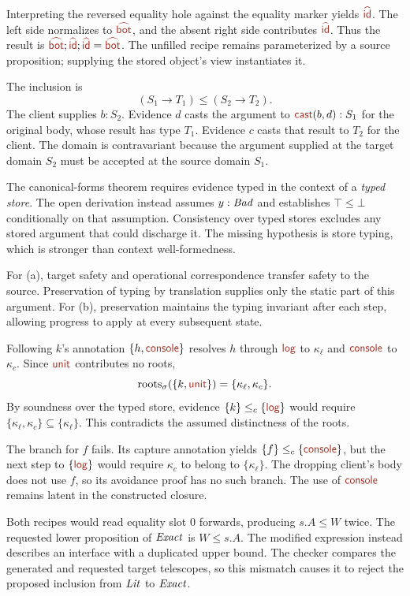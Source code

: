 Interpreting the reversed equality hole against the equality marker
yields $\form{id}$. The left side normalizes to $\form{bot}$, and the
absent right side contributes $\form{id}$. Thus the result is
$\form{bot};\form{id};\form{id}=\form{bot}$.
The unfilled recipe remains parameterized by a source proposition;
supplying the stored object's view instantiates it.

The inclusion is
\[
 (S_1\to T_1)\le(S_2\to T_2).
\]
The client supplies $b:S_2$. Evidence $d$ casts the argument to
$\cast{b}{d}:S_1$ for the original body, whose result has type $T_1$.
Evidence $c$ casts that result to $T_2$ for the client.
The domain is contravariant because the argument supplied at the target
domain $S_2$ must be accepted at the source domain $S_1$.

The canonical-forms theorem requires evidence typed in the context of
a \emph{typed store}. The open derivation instead assumes $y:\mathit{Bad}$
and establishes $\top\le\bot$ conditionally on that assumption.
Consistency over typed stores excludes any stored argument that could
discharge it. The missing hypothesis is store typing, which is stronger
than context well-formedness.

For (a), target safety and operational correspondence transfer safety
to the source. Preservation of typing by translation supplies only the
static part of this argument.
For (b), preservation maintains the typing invariant after each step,
allowing progress to apply at every subsequent state.

Following $k$'s annotation $\{h,\ev{console}\}$ resolves $h$ through
$\ev{log}$ to $\kappa_{\ell}$ and $\ev{console}$ to $\kappa_c$.
Since $\ev{unit}$ contributes no roots,
\[
 \roots{\{k,\ev{unit}\}}=\{\kappa_{\ell},\kappa_c\}.
\]
By soundness over the typed store, evidence
$\{k\}\le_c\{\ev{log}\}$ would require
$\{\kappa_{\ell},\kappa_c\}\subseteq\{\kappa_{\ell}\}$.
This contradicts the assumed distinctness of the roots.

The branch for $f$ fails. Its capture annotation yields
$\{f\}\le_c\{\ev{console}\}$, but the next step to
$\{\ev{log}\}$ would require $\kappa_c$ to belong to
$\{\kappa_{\ell}\}$. The dropping client's body does not use $f$,
so its avoidance proof has no such branch.
The use of $\ev{console}$ remains latent in the constructed closure.

Both recipes would read equality slot 0 forwards, producing
$s.A\le W$ twice.
The requested lower proposition of $\mathit{Exact}$ is $W\le s.A$.
The modified expression instead describes an interface with a duplicated
upper bound. The checker compares the generated and requested target
telescopes, so this mismatch causes it to reject the proposed inclusion
from $\mathit{Lit}$ to $\mathit{Exact}$.

